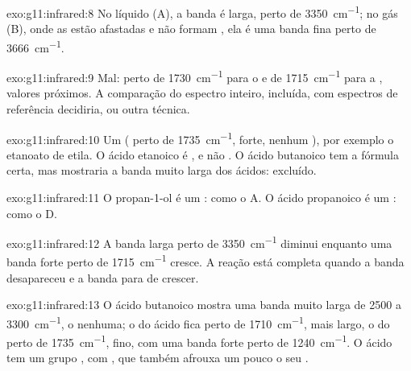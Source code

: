 \begin{solution}{exo:g11:infrared:8}
No líquido (A), a banda  é larga, perto de
\qty{3350}{cm^{-1}}; no gás (B), onde as  estão afastadas e não
formam , ela é uma banda fina perto de
\qty{3666}{cm^{-1}}.
\end{solution}

\begin{solution}{exo:g11:infrared:9}
Mal: perto de \qty{1730}{cm^{-1}} para o  e de
\qty{1715}{cm^{-1}} para a , valores próximos. A comparação do
espectro inteiro,  incluída, com espectros de
referência decidiria, ou outra técnica.
\end{solution}

\begin{solution}{exo:g11:infrared:10}
Um  ( perto de \qty{1735}{cm^{-1}},  forte, nenhum
), por exemplo o etanoato de etila. O ácido etanoico é
, e não . O ácido butanoico tem a fórmula certa,
mas mostraria a banda  muito larga dos ácidos: excluído.
\end{solution}

\begin{solution}{exo:g11:infrared:11}
O propan-1-ol é um : como o A. O ácido propanoico é um : como o D.
\end{solution}

\begin{solution}{exo:g11:infrared:12}
A banda  larga perto de \qty{3350}{cm^{-1}} diminui enquanto uma
banda  forte perto de \qty{1715}{cm^{-1}} cresce. A reação está
completa quando a banda  desapareceu e a banda  para de
crescer.
\end{solution}

\begin{solution}{exo:g11:infrared:13}
O ácido butanoico mostra uma banda  muito larga de 2500 a
\qty{3300}{cm^{-1}}, o  nenhuma; o  do ácido fica perto de
\qty{1710}{cm^{-1}}, mais largo, o do  perto de
\qty{1735}{cm^{-1}}, fino, com uma banda  forte perto de
\qty{1240}{cm^{-1}}. O ácido tem um grupo , com , que também afrouxa um pouco o seu .
\end{solution}

